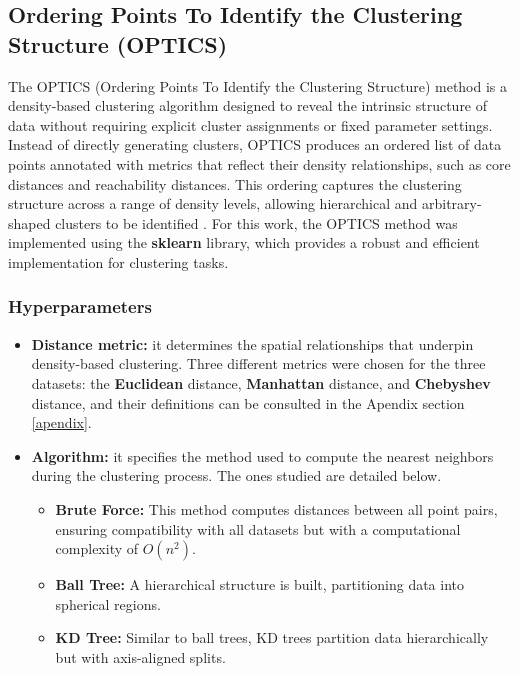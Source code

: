 \subsection{Ordering Points To Identify the Clustering Structure (OPTICS)}

The OPTICS (Ordering Points To Identify the Clustering Structure) method is a density-based clustering algorithm designed
to reveal the intrinsic structure of data without requiring explicit cluster assignments or fixed parameter settings.
Instead of directly generating clusters, OPTICS produces an ordered list of data points annotated with metrics that
reflect their density relationships, such as core distances and reachability distances. This ordering captures the
clustering structure across a range of density levels, allowing hierarchical and arbitrary-shaped clusters to be identified \cite{10.1145/304181.304187}.
For this work, the OPTICS method was implemented using the \textbf{sklearn} library, which provides a robust and efficient implementation for clustering tasks.

\subsubsection{Hyperparameters}
\begin{itemize}
    \item \textbf{Distance metric:} it determines the spatial relationships that underpin density-based
    clustering. Three different metrics were chosen for the three datasets: the \textbf{Euclidean} distance, \textbf{Manhattan}
     distance, and \textbf{Chebyshev} distance, and their definitions can be consulted in the Apendix section \ref{apendix}.
\end{itemize}

\begin{itemize}
    \item \textbf{Algorithm:} it specifies the method used to compute the nearest neighbors during the clustering process. The ones
    studied are detailed below.
    \begin{itemize}
        \item \textbf{Brute Force:} This method computes distances between all point pairs, ensuring compatibility with all
        datasets but with a computational complexity of $O(n^2)$.
        \item \textbf{Ball Tree:} A hierarchical structure is built, partitioning data into spherical regions.
        \item \textbf{KD Tree:} Similar to ball trees, KD trees partition data hierarchically but with axis-aligned splits.
    \end{itemize}
\end{itemize}

